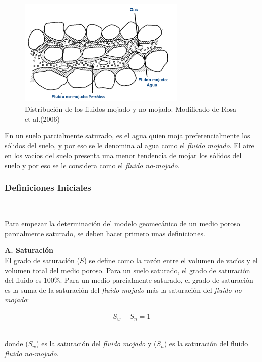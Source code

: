 \begin{figure}[!ht]
\centering
\includegraphics[width=8cm]{Imagenes/Mojabilidad.png}
\caption[Distribución de los fluidos mojado y no-mojado]{Distribución de los fluidos mojado y no-mojado. Modificado de Rosa et al.(2006) \cite{Rosa2006EngenhariaPetroleo}}
\label{fig:fig32}
\end{figure}

En un suelo parcialmente saturado, es el agua quien moja preferencialmente los sólidos del suelo, y por eso se le denomina al agua como el \textit{fluido mojado}. El aire en los vacíos del suelo presenta una menor tendencia de mojar los sólidos del suelo y por eso se le considera como el \textit{fluido no-mojado}.\newpage



\subsubsection{Definiciones Iniciales}~\hypertarget{sec:sec3221}{}
\label{sec:sec3221}

Para empezar la determinación del modelo geomecánico de un medio poroso parcialmente saturado, se deben hacer primero unas definiciones.\bigskip


\textbf{A. Saturación}
\\
El grado de saturación ($S$) se define como la razón entre el volumen de vacíos y el volumen total del medio poroso. Para un suelo saturado, el grado de saturación del fluido es 100\%. Para un medio parcialmente saturado, el grado de saturación es la suma de la saturación del \textit{fluido mojado} más la saturación del \textit{fluido no-mojado}:

\begin{ceqn} 
\begin{gather} \label{eq:equ324} 
S_w + S_n = 1
\end{gather}  
\end{ceqn}
\\
donde ($S_w$) es la saturación del \textit{fluido mojado} y ($S_n$) es la saturación del fluido \textit{fluido no-mojado}.\bigskip


